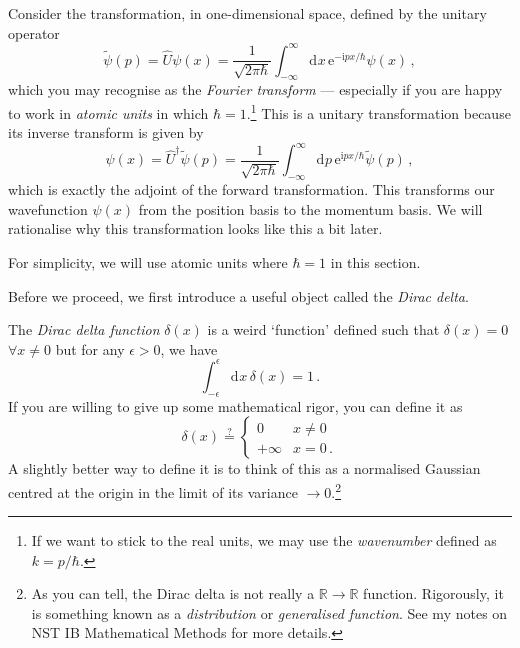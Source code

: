 \documentclass{article}
\theoremstyle{plain}\theoremheaderfont{\normalfont\itshape}\theorembodyfont{\rmfamily}\theoremseparator{.}\newtheorem*{rem}{Remark}\newtheorem*{ex}{Example}\newtheorem*{proof}{Proof}\newtheorem*{altp}{Alternative proof}
\theoremstyle{plain}\theoremheaderfont{\normalfont\bfseries}\theorembodyfont{\rmfamily}\theoremseparator{.}\newtheorem{thm}{Theorem}[section]\newtheorem{lem}[thm]{Lemma}\newtheorem{prop}[thm]{Proposition}\newtheorem*{cor}{Corollary}\newtheorem{defn}[thm]{Definition}\newtheorem{clm}[thm]{Claim}\newtheorem{clminproof}{Claim}
\theoremstyle{break}\theoremheaderfont{\normalfont\itshape}\theorembodyfont{\rmfamily}\theoremseparator{.\medskip}\newtheorem*{proofskip}{Proof}\newtheorem*{exs}{Examples}\newtheorem*{rems}{Remarks}
\theoremstyle{break}\theoremheaderfont{\normalfont\bfseries}\theorembodyfont{\rmfamily}\theoremseparator{.\medskip}\newtheorem{lemskip}[thm]{Lemma}\newtheorem{defnskip}[thm]{Definition}\newtheorem{propskip}[thm]{Proposition}\newtheorem{thmskip}[thm]{Theorem}
\numberwithin{equation}{section}
\newcommand{\ii}{\mathrm{i}}
\newcommand{\ee}{\mathrm{e}}
\newcommand{\dd}[2][]{\mathrm{d}^{#1} #2\,}
\newcommand{\RR}{\mathbb{R}}
\begin{document}
    Consider the transformation, in one-dimensional space, defined by the unitary operator
    \begin{equation}
        \tilde{\psi}(p)=\hat{U}\psi(x)=\frac{1}{\sqrt{2\pi\hbar}}\int_{-\infty}^{\infty}\dd{x}\ee^{-\ii px/\hbar}\psi(x)\,,
    \end{equation}
    which you may recognise as the \textit{Fourier transform} --- especially if you are happy to work in \textit{atomic units} in which \(\hbar=1\).\footnote{If we want to stick to the real units, we may use the \textit{wavenumber} defined as \(k=p/\hbar\).} This is a unitary transformation because its inverse transform is given by
    \begin{equation}
        \psi(x)=\hat{U}^\dagger\tilde{\psi}(p)=\frac{1}{\sqrt{2\pi\hbar}}\int_{-\infty}^{\infty}\dd{p}\ee^{\ii px/\hbar}\tilde{\psi}(p)\,,
    \end{equation} 
    which is exactly the adjoint of the forward transformation. This transforms our wavefunction \(\psi(x)\) from the position basis to the momentum basis. We will rationalise why this transformation looks like this a bit later.

    For simplicity, we will use atomic units where \(\hbar=1\) in this section.
    
    Before we proceed, we first introduce a useful object called the \textit{Dirac delta}.
    
    The \textit{Dirac delta function} \(\delta(x)\) is a weird `function' defined such that \(\delta(x)= 0\) \(\forall x\ne 0\) but for any \(\epsilon>0\), we have
    \begin{equation}
        \int_{-\epsilon}^{\epsilon}\dd{x}\delta(x)=1\,.
    \end{equation}
    If you are willing to give up some mathematical rigor, you can define it as
    \begin{equation}
        \delta(x)\stackrel{?}{=}\begin{cases}
            0 & x\ne 0 \\
            +\infty & x=0\,.
        \end{cases}
    \end{equation}
    A slightly better way to define it is to think of this as a normalised Gaussian centred at the origin in the limit of its variance \(\to 0\).\footnote{As you can tell, the Dirac delta is not really a \(\RR\to\RR\) function. Rigorously, it is something known as a \textit{distribution} or \textit{generalised function}. See my notes on NST IB Mathematical Methods for more details.}
    
\end{document}
